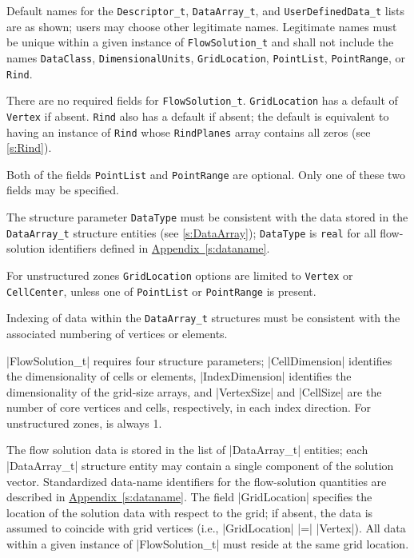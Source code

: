 \begin{notes}
\item Default names for the \texttt{Descriptor\_t},
      \texttt{DataArray\_t}, and \texttt{UserDefinedData\_t} lists are
      as shown; users may choose other legitimate names.
      Legitimate names must be unique within a given instance
      of \texttt{FlowSolution\_t} and shall not include the
      names \texttt{DataClass}, \texttt{DimensionalUnits},
      \texttt{GridLocation}, \texttt{PointList}, \texttt{PointRange},
      or \texttt{Rind}.
\item There are no required fields for \texttt{FlowSolution\_t}.
      \texttt{GridLocation} has a default of \texttt{Vertex} if
      absent. \texttt{Rind} also has a default if absent; the
      default is equivalent to having an instance of \texttt{Rind}
      whose \texttt{RindPlanes} array contains all zeros (see
      \autoref{s:Rind}).
\item Both of the fields \texttt{PointList} and \texttt{PointRange}
      are optional. Only one of these two fields may be specified.
\item The structure parameter \texttt{DataType} must be consistent
      with the data stored in the \texttt{DataArray\_t} structure
      entities (see \autoref{s:DataArray}); \texttt{DataType} is
      \texttt{real} for all flow-solution identifiers defined in
      \hyperref[s:dataname]{Appendix~\ref*{s:dataname}}.
\item For unstructured zones \texttt{GridLocation} options are limited
      to \texttt{Vertex} or \texttt{CellCenter}, unless one of
      \texttt{PointList} or \texttt{PointRange} is present.
\item Indexing of data within the \texttt{DataArray\_t} structures must
      be consistent with the associated numbering of vertices or elements.
\end{notes}

|FlowSolution_t| requires four structure parameters; |CellDimension|
identifies the dimensionality of cells or elements, |IndexDimension|
identifies the dimensionality of the grid-size arrays, and |VertexSize|
and |CellSize| are the number of core vertices and cells, respectively,
in each index direction.
For unstructured zones,  is always 1.

The flow solution data is stored in the list of |DataArray_t| entities;
each |DataArray_t| structure entity may contain a single component of
the solution vector.
Standardized data-name identifiers for the flow-solution quantities are
described in \hyperref[s:dataname]{Appendix~\ref*{s:dataname}}.
The field |GridLocation| specifies the location of the solution data
with respect to the grid; if absent, the data is assumed to coincide
with grid vertices (i.e., |GridLocation| |=| |Vertex|).
All data within a given instance of |FlowSolution_t| must reside at the
same grid location.

